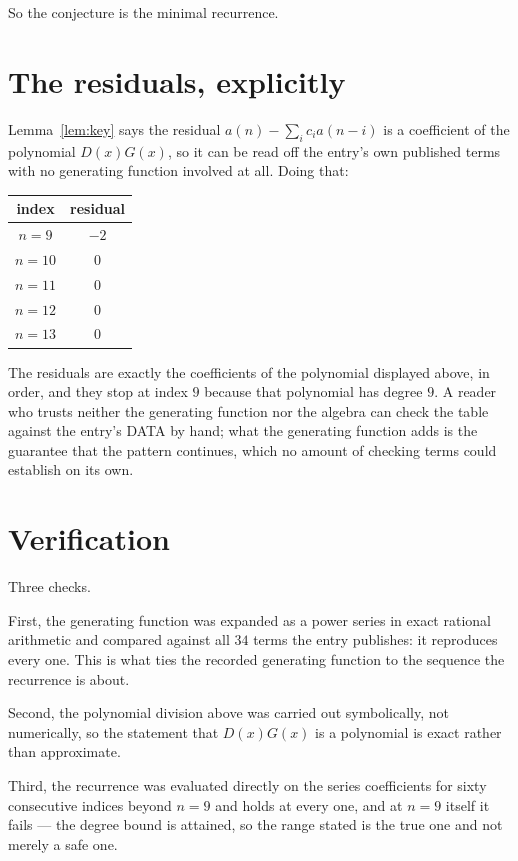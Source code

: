 \documentclass[11pt,a4paper]{article}
\theoremstyle{plain}
\theoremstyle{definition}
\begin{document}
So the conjecture is the minimal recurrence.

\section{The residuals, explicitly}

Lemma~\ref{lem:key} says the residual $a(n)-\sum_ic_ia(n-i)$ is a coefficient of the
polynomial $D(x)G(x)$, so it can be read off the entry's own published terms with no
generating function involved at all. Doing that:
\begin{center}
\begin{tabular}{cc}
index & residual \\ \hline
$n=9$ & $-2$ \\
$n=10$ & $0$ \\
$n=11$ & $0$ \\
$n=12$ & $0$ \\
$n=13$ & $0$
\end{tabular}
\end{center}
The residuals are exactly the coefficients of the polynomial displayed above, in order, and
they stop at index $9$ because that polynomial has degree $9$. A reader who trusts
neither the generating function nor the algebra can check the table against the entry's DATA
by hand; what the generating function adds is the guarantee that the pattern continues, which
no amount of checking terms could establish on its own.

\section{Verification}

Three checks.

First, the generating function was expanded as a power series in exact rational arithmetic and
compared against all $34$ terms the entry publishes: it reproduces every one. This is
what ties the recorded generating function to the sequence the recurrence is about.

Second, the polynomial division above was carried out symbolically, not numerically, so the
statement that $D(x)G(x)$ is a polynomial is exact rather than approximate.

Third, the recurrence was evaluated directly on the series coefficients for sixty consecutive
indices beyond $n=9$ and holds at every one, and at $n=9$ itself it fails --- the
degree bound is attained, so the range stated is the true one and not merely a safe one.
\end{document}
